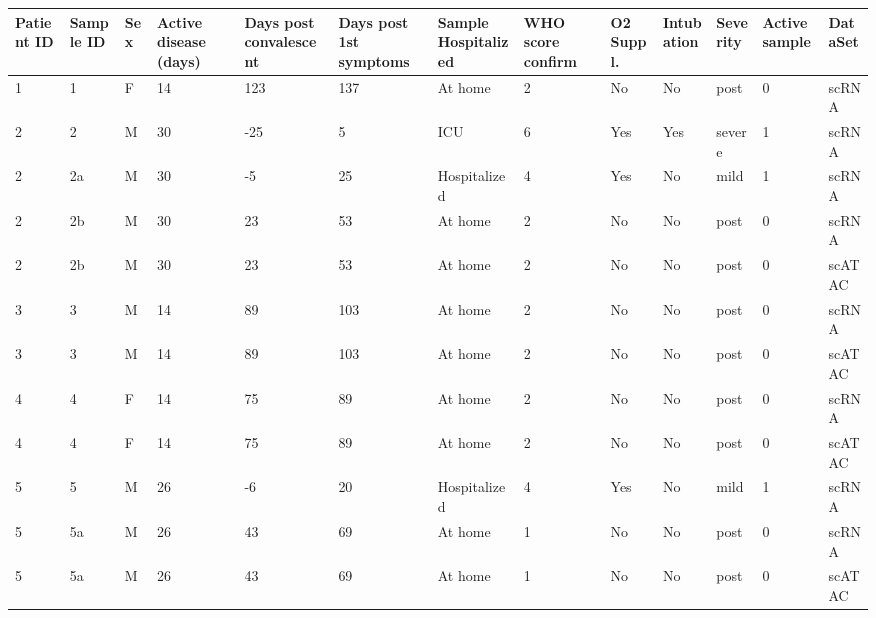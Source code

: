 \documentclass{book}
\begin{document}
\begin{refsection}
\renewcommand{\thetable}{\textbf{Table S\arabic{chapter}.\arabic{table}}}
\setcounter{table}{0}

\begin{landscape}
  \scriptsize
  \begin{longtable}{p{0.7cm}p{0.7cm}p{0.5cm}p{0.75cm}p{0.75cm}p{0.75cm}p{1.75cm}p{0.8cm}p{0.75cm}p{1cm}p{0.75cm}p{1cm}p{0.75cm}}
    \hline
    Patient ID & Sample ID & Sex & Active disease (days) & Days post convalescent & Days post 1st symptoms & Sample Hospitalized & WHO score confirm & O2 Suppl. & Intubation & Severity & Active sample & DataSet \\
    \hline
    1  & 1   & F & 14 & 123 & 137 & At home                                            & 2 & No  & No  & post   & 0 & scRNA \\
    2  & 2   & M & 30 & -25 & 5   & ICU                                                & 6 & Yes & Yes & severe & 1 & scRNA \\
    2  & 2a  & M & 30 & -5  & 25  & Hospitalized                                       & 4 & Yes & No  & mild   & 1 & scRNA \\
    2  & 2b  & M & 30 & 23  & 53  & At home                                            & 2 & No  & No  & post   & 0 & scRNA \\
    2  & 2b  & M & 30 & 23  & 53  & At home                                            & 2 & No  & No  & post   & 0 & scATAC \\
    3  & 3   & M & 14 & 89  & 103 & At home                                            & 2 & No  & No  & post   & 0 & scRNA \\
    3  & 3   & M & 14 & 89  & 103 & At home                                            & 2 & No  & No  & post   & 0 & scATAC \\
    4  & 4   & F & 14 & 75  & 89  & At home                                            & 2 & No  & No  & post   & 0 & scRNA \\
    4  & 4   & F & 14 & 75  & 89  & At home                                            & 2 & No  & No  & post   & 0 & scATAC \\
    5  & 5   & M & 26 & -6  & 20  & Hospitalized                                       & 4 & Yes & No  & mild   & 1 & scRNA \\
    5  & 5a  & M & 26 & 43  & 69  & At home                                            & 1 & No  & No  & post   & 0 & scRNA \\
    5  & 5a  & M & 26 & 43  & 69  & At home                                            & 1 & No  & No  & post   & 0 & scATAC \\

\end{longtable}
\end{landscape}
\end{refsection}
\end{document}

